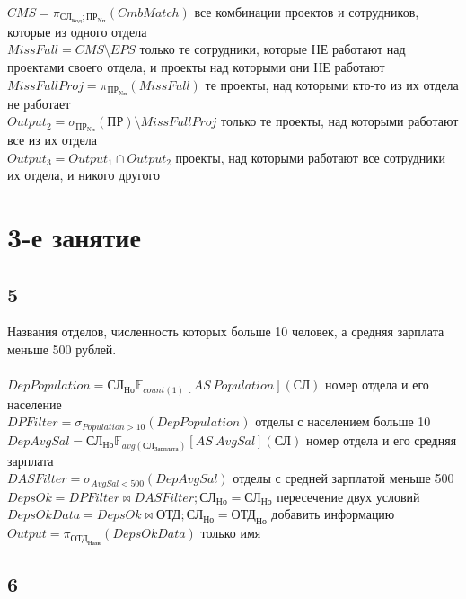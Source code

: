 \documentclass[12pt]{article}
\newcommand{\employee}{\textbf{СЛ}}
\newcommand{\department}{\textbf{ОТД}}
\newcommand{\project}{\textbf{ПР}}
\newcommand{\employeeId}{\textbf{СЛ}_\text{Код}}
\newcommand{\employeeSalary}{\textbf{СЛ}_\text{Зарплата}}
\newcommand{\employeeDepId}{\textbf{СЛ}_\text{Но}}
\newcommand{\departmentName}{\textbf{ОТД}_\text{Назв}}
\newcommand{\departmentId}{\textbf{ОТД}_\text{Но}}
\newcommand{\projectId}{\textbf{ПР}_\text{Nп}}
\newcommand{\filter}[2]{\sigma{}_{#1} \allowbreak \left( #2 \right)}
\newcommand{\join}[3]{ #1 \bowtie #2;\allowbreak #3 }
\newcommand{\select}[2]{\pi_{#1} \allowbreak \left( #2 \right)}
\newcommand{\aggregate}[4]{  #1 \mathbb{F}_{#2} \left[AS\ #3 \right] \left( #4 \right)  }
\begin{document}
    $ CMS = \select{\employeeId; \projectId}{CmbMatch}$ 
 все комбинации проектов и сотрудников, которые из одного отдела \\ 
    $ MissFull = CMS \setminus EPS$ 
 только те сотрудники, которые НЕ работают над проектами своего отдела, и проекты над которыми они НЕ работают \\ 
    $ MissFullProj = \select{\projectId}{MissFull}$ 
 те проекты, над которыми кто-то из их отдела не работает \\ 
    $ Output_2 = \filter{\projectId}{\project} \setminus MissFullProj$ 
 только те проекты, над которыми работают все из их отдела \\ 
    $ Output_3 = Output_1 \cap Output_2 $ 
 проекты, над которыми работают все сотрудники их отдела, и никого другого \\ 

\section{3-е занятие}
\subsection{5}
Названия отделов, численность которых больше 10 человек, а средняя зарплата меньше 500 рублей.\\\\
    $ DepPopulation = \aggregate{\employeeDepId}{count(1)}{Population}{\employee}$ 
 номер отдела и его население \\ 
    $ DPFilter = \filter{Population > 10}{DepPopulation}$ 
 отделы с населением больше 10 \\ 
    $ DepAvgSal = \aggregate{\employeeDepId}{avg(\employeeSalary)}{AvgSal}{\employee}$ 
 номер отдела и его средняя зарплата \\ 
    $ DASFilter = \filter{AvgSal < 500}{DepAvgSal} $ 
 отделы с средней зарплатой меньше 500 \\ 
    $ DepsOk = \join{DPFilter}{DASFilter}{\employeeDepId = \employeeDepId}$ 
 пересечение двух условий \\ 
    $ DepsOkData = \join{DepsOk}{\department}{\employeeDepId = \departmentId}$ 
 добавить информацию \\  
    $ Output = \select{\departmentName}{DepsOkData}$ 
 только имя \\ 

\subsection{6}
\end{document}
